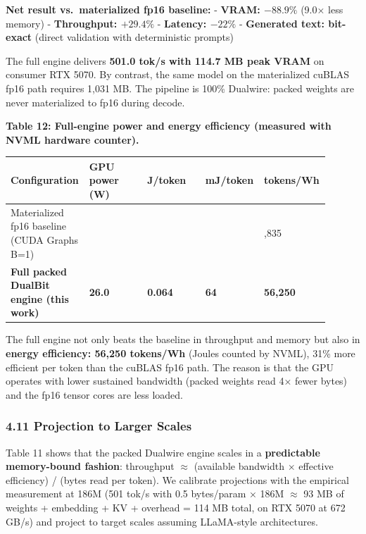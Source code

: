 \textbf{Net result vs.~materialized fp16 baseline:} - \textbf{VRAM:
\(-88.9\%\)} (9.0× less memory) - \textbf{Throughput: \(+29.4\%\)} -
\textbf{Latency: \(-22\%\)} - \textbf{Generated text: bit-exact} (direct
validation with deterministic prompts)

The full engine delivers \textbf{501.0 tok/s with 114.7 MB peak VRAM} on
consumer RTX 5070. By contrast, the same model on the materialized
cuBLAS fp16 path requires 1,031 MB. The pipeline is 100\% Dualwire:
packed weights are never materialized to fp16 during decode.

\textbf{Table 12: Full-engine power and energy efficiency (measured with
NVML hardware counter).}

{\def\LTcaptype{none} %
{\footnotesize\setlength{\tabcolsep}{3pt}
\begin{longtable}[]{@{}>{\raggedright\arraybackslash}p{0.180\linewidth}>{\raggedright\arraybackslash}p{0.180\linewidth}>{\raggedright\arraybackslash}p{0.180\linewidth}>{\raggedright\arraybackslash}p{0.180\linewidth}>{\raggedright\arraybackslash}p{0.180\linewidth}@{}}
\toprule\noalign{}
Configuration & GPU power (W) & J/token & mJ/token & tokens/Wh \\
\midrule\noalign{}
\endhead
\bottomrule\noalign{}
\endlastfoot
Materialized fp16 baseline (CUDA Graphs B=1) & 38.8 & 0.084 & 84 &
42,835 \\
\textbf{Full packed DualBit engine (this work)} & \textbf{26.0} &
\textbf{0.064} & \textbf{64} & \textbf{56,250} \\
\end{longtable}
}
}

The full engine not only beats the baseline in throughput and memory but
also in \textbf{energy efficiency: 56,250 tokens/Wh} (Joules counted by
NVML), 31\% more efficient per token than the cuBLAS fp16 path. The
reason is that the GPU operates with lower sustained bandwidth (packed
weights read 4× fewer bytes) and the fp16 tensor cores are less loaded.

\subsubsection{4.11 Projection to Larger
Scales}\label{projection-to-larger-scales}

Table 11 shows that the packed Dualwire engine scales in a
\textbf{predictable memory-bound fashion}: throughput \(\approx\)
(available bandwidth \(\times\) effective efficiency) / (bytes read per
token). We calibrate projections with the empirical measurement at 186M
(501 tok/s with 0.5 bytes/param × 186M \(\approx\) 93 MB of weights +
embedding + KV + overhead = 114 MB total, on RTX 5070 at 672 GB/s) and
project to target scales assuming LLaMA-style architectures.

